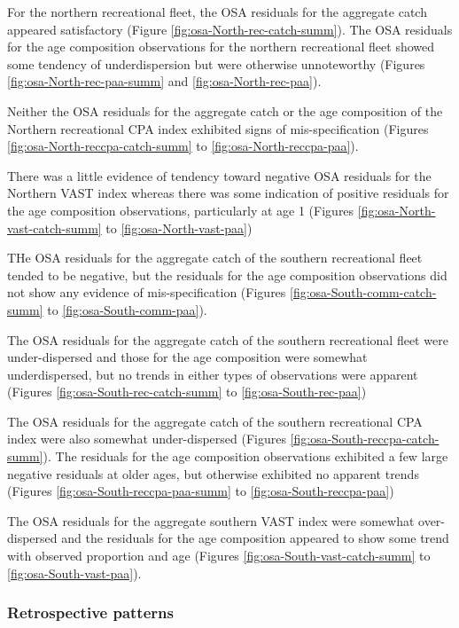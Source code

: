 \documentclass[
]{article}
\begin{document}
For the northern recreational fleet, the OSA residuals for the aggregate catch appeared satisfactory (Figure \ref{fig:osa-North-rec-catch-summ}). The OSA residuals for the age composition observations for the northern recreational fleet showed some tendency of underdispersion but were otherwise unnoteworthy (Figures \ref{fig:osa-North-rec-paa-summ} and \ref{fig:osa-North-rec-paa}).

Neither the OSA residuals for the aggregate catch or the age composition of the Northern recreational CPA index exhibited signs of mis-specification (Figures \ref{fig:osa-North-reccpa-catch-summ} to \ref{fig:osa-North-reccpa-paa}).

There was a little evidence of tendency toward negative OSA residuals for the Northern VAST index whereas there was some indication of positive residuals for the age composition observations, particularly at age 1 (Figures \ref{fig:osa-North-vast-catch-summ} to \ref{fig:osa-North-vast-paa})

THe OSA residuals for the aggregate catch of the southern recreational fleet tended to be negative, but the residuals for the age composition observations did not show any evidence of mis-specification (Figures \ref{fig:osa-South-comm-catch-summ} to \ref{fig:osa-South-comm-paa}).

The OSA residuals for the aggregate catch of the southern recreational fleet were under-dispersed and those for the age composition were somewhat underdispersed, but no trends in either types of observations were apparent (Figures \ref{fig:osa-South-rec-catch-summ} to \ref{fig:osa-South-rec-paa})

The OSA residuals for the aggregate catch of the southern recreational CPA index were also somewhat under-dispersed (Figures \ref{fig:osa-South-reccpa-catch-summ}). The residuals for the age composition observations exhibited a few large negative residuals at older ages, but otherwise exhibited no apparent trends (Figures \ref{fig:osa-South-reccpa-paa-summ} to \ref{fig:osa-South-reccpa-paa})

The OSA residuals for the aggregate southern VAST index were somewhat over-dispersed and the residuals for the age composition appeared to show some trend with observed proportion and age (Figures \ref{fig:osa-South-vast-catch-summ} to \ref{fig:osa-South-vast-paa}).

\hypertarget{retrospective-patterns}{%
\subsubsection{Retrospective patterns}\label{retrospective-patterns}}
\end{document}
